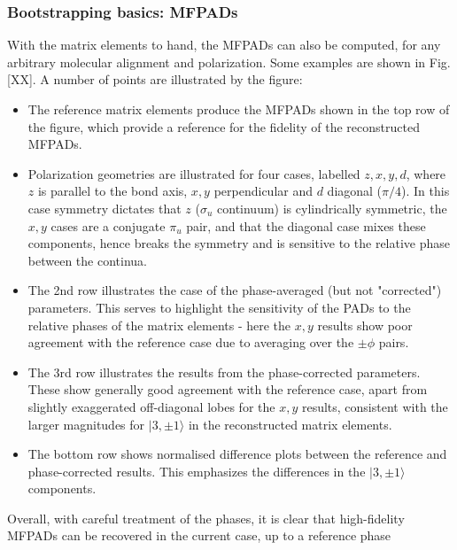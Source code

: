 \subsubsection{Bootstrapping basics: MFPADs}

With the matrix elements to hand, the MFPADs can also be computed, for any arbitrary molecular alignment and polarization. Some examples are shown in Fig. [XX]. A number of points are illustrated by the figure:

\begin{itemize}
\item The reference matrix elements produce the MFPADs shown in the top row of the figure, which provide a reference for the fidelity of the reconstructed MFPADs. 
\item Polarization geometries are illustrated for four cases, labelled $z,x,y,d$, where $z$ is parallel to the bond axis, $x,y$ perpendicular and $d$ diagonal ($\pi/4$). In this case symmetry dictates that $z$ ($\sigma_u$ continuum) is cylindrically symmetric, the $x,y$ cases are a conjugate $\pi_u$ pair, and that the diagonal case mixes these components, hence breaks the symmetry and is sensitive to the relative phase between the continua.
\item The 2nd row illustrates the case of the phase-averaged (but not "corrected") parameters. This serves to highlight the sensitivity of the PADs to the relative phases of the matrix elements - here the $x,y$ results show poor agreement with the reference case due to averaging over the $\pm\phi$ pairs.
\item The 3rd row illustrates the results from the phase-corrected parameters. These show generally good agreement with the reference case, apart from slightly exaggerated off-diagonal lobes for the $x,y$ results, consistent with the larger magnitudes for $|3,\pm1\rangle$ in the reconstructed matrix elements.
\item The bottom row shows normalised difference plots between the reference and phase-corrected results. This emphasizes the differences in the $|3,\pm1\rangle$ components.
\end{itemize}

Overall, with careful treatment of the phases, it is clear that high-fidelity MFPADs can be recovered in the current case, up to a reference phase

